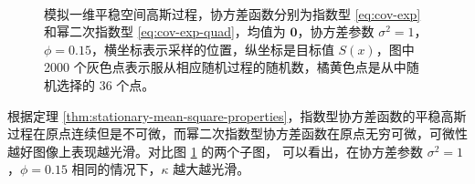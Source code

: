 \documentclass[12pt,a4paper,UTF8,twoside]{book}
\theoremstyle{definition}
\theoremstyle{definition}
\theoremstyle{definition}
\theoremstyle{remark}
\begin{document}
\begin{figure}[!htb]

{\centering {}\\

}

\caption{模拟一维平稳空间高斯过程，协方差函数分别为指数型
\eqref{eq:cov-exp} 和幂二次指数型 \eqref{eq:cov-exp-quad}，均值为
\(\mathbf{0}\)，协方差参数
\(\sigma^2 = 1\)，\(\phi = 0.15\)，横坐标表示采样的位置，纵坐标是目标值
\(S(x)\)，图中 2000
个灰色点表示服从相应随机过程的随机数，橘黄色点是从中随机选择的 36 个点。}\label{fig:one-dim-gp}
\end{figure}








根据定理
\ref{thm:stationary-mean-square-properties}，指数型协方差函数的平稳高斯过程在原点连续但是不可微，而幂二次指数型协方差函数在原点无穷可微，可微性越好图像上表现越光滑。对比图
\ref{fig:one-dim-gp} 的两个子图， 可以看出，在协方差参数
\(\sigma^2 = 1\)，\(\phi = 0.15\) 相同的情况下，\(\kappa\) 越大越光滑。
\end{document}
